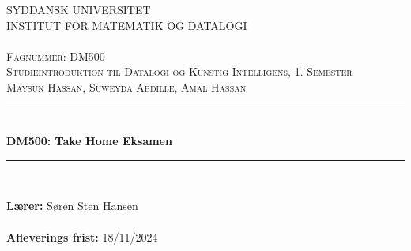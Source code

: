 \begin{titlepage}
        \begin{center}
        \textsc{\LARGE SYDDANSK UNIVERSITET}\\[0.3cm]
                \textsc{\Large INSTITUT FOR MATEMATIK OG DATALOGI}\\[0.3cm]
                \textsc{\large }\\[1.2cm]

   
      \vspace{0.5cm}
        \textsc{\large{Fagnummer: DM500}}\\[0.5cm]
        \textsc{\large{Studieintroduktion til Datalogi og Kunstig Intelligens, 1. Semester}}\\[0.5cm]
        \textsc{\large{Maysun Hassan, Suweyda Abdille, Amal Hassan}}\\[0.5cm]
        \rule{\linewidth}{0.5mm}\\[0.4cm]
        { \LARGE \bfseries  DM500: Take Home Eksamen \\[0.4cm]}
        \rule{\linewidth}{0.5mm}\\[1.5cm]
         
       
        \vspace{1.5cm}

       
        \textbf{Lærer:} Søren Sten Hansen \\ \mbox{}\\
        \textbf{Afleverings frist:} 18/11/2024
       
       \end{center}
       

\clearpage
   \end{titlepage}